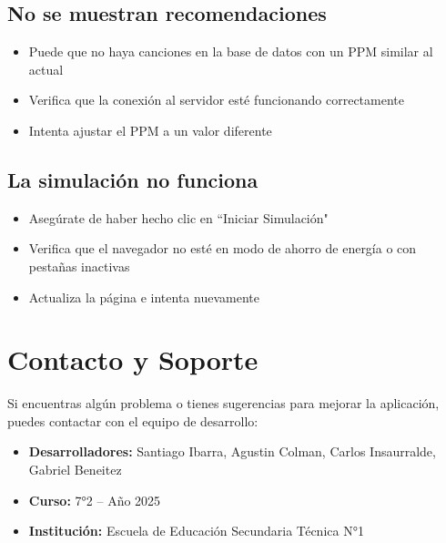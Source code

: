 \documentclass[a4paper,12pt]{article}
\begin{document}
\subsection{No se muestran recomendaciones}
\begin{itemize}
    \item Puede que no haya canciones en la base de datos con un PPM similar al actual
    \item Verifica que la conexión al servidor esté funcionando correctamente
    \item Intenta ajustar el PPM a un valor diferente
\end{itemize}

\subsection{La simulación no funciona}
\begin{itemize}
    \item Asegúrate de haber hecho clic en ``Iniciar Simulación"
    \item Verifica que el navegador no esté en modo de ahorro de energía o con pestañas inactivas
    \item Actualiza la página e intenta nuevamente
\end{itemize}

\section{Contacto y Soporte}
Si encuentras algún problema o tienes sugerencias para mejorar la aplicación, puedes contactar con el equipo de desarrollo:

\begin{itemize}
    \item \textbf{Desarrolladores:} Santiago Ibarra, Agustin Colman, Carlos Insaurralde, Gabriel Beneitez
    \item \textbf{Curso:} 7°2 -- Año 2025
    \item \textbf{Institución:} Escuela de Educación Secundaria Técnica N°1
\end{itemize}
\end{document}
